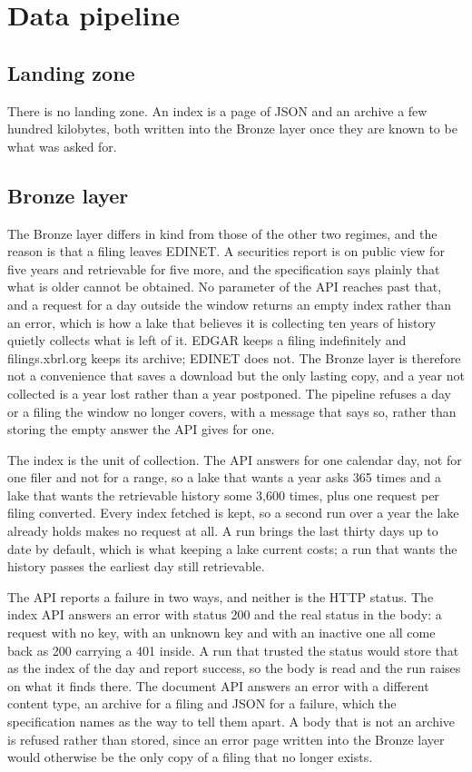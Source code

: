 \section{Data pipeline}

\subsection{Landing zone}

There is no landing zone. An index is a page of JSON and an archive a few hundred kilobytes, both written into the Bronze layer once they are known to be what was asked for.

\subsection{Bronze layer}

The Bronze layer differs in kind from those of the other two regimes, and the reason is that a filing leaves EDINET. A securities report is on public view for five years and retrievable for five more, and the specification says plainly that what is older cannot be obtained. No parameter of the API reaches past that, and a request for a day outside the window returns an empty index rather than an error, which is how a lake that believes it is collecting ten years of history quietly collects what is left of it. EDGAR keeps a filing indefinitely and filings.xbrl.org keeps its archive; EDINET does not. The Bronze layer is therefore not a convenience that saves a download but the only lasting copy, and a year not collected is a year lost rather than a year postponed. The pipeline refuses a day or a filing the window no longer covers, with a message that says so, rather than storing the empty answer the API gives for one.

The index is the unit of collection. The API answers for one calendar day, not for one filer and not for a range, so a lake that wants a year asks 365 times and a lake that wants the retrievable history some 3,600 times, plus one request per filing converted. Every index fetched is kept, so a second run over a year the lake already holds makes no request at all. A run brings the last thirty days up to date by default, which is what keeping a lake current costs; a run that wants the history passes the earliest day still retrievable.

The API reports a failure in two ways, and neither is the HTTP status. The index API answers an error with status 200 and the real status in the body: a request with no key, with an unknown key and with an inactive one all come back as 200 carrying a 401 inside. A run that trusted the status would store that as the index of the day and report success, so the body is read and the run raises on what it finds there. The document API answers an error with a different content type, an archive for a filing and JSON for a failure, which the specification names as the way to tell them apart. A body that is not an archive is refused rather than stored, since an error page written into the Bronze layer would otherwise be the only copy of a filing that no longer exists.

